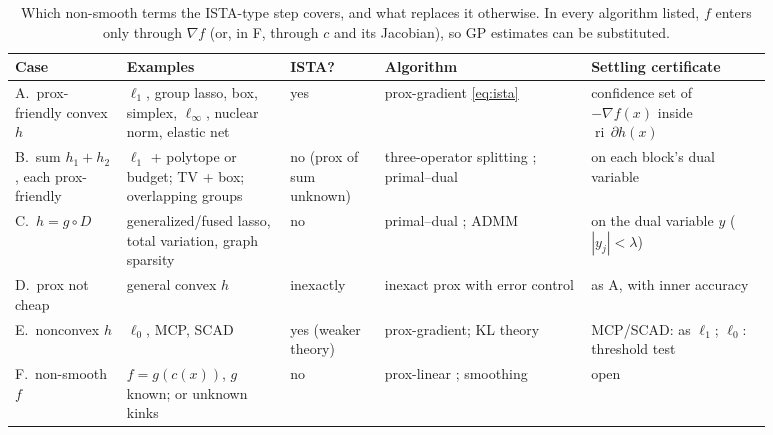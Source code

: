 \documentclass[10pt]{article}
\newcommand{\ri}{\operatorname{ri}}
\theoremstyle{remark}
\begin{document}
\begin{table}[t]
\centering\small
\begin{tabular}{@{}L{0.13\linewidth}L{0.19\linewidth}L{0.11\linewidth}L{0.24\linewidth}L{0.21\linewidth}@{}}
\toprule
Case & Examples & ISTA? & Algorithm & Settling certificate\\\midrule
A.\ prox-friendly convex $h$ & $\ell_1$, group lasso, box, simplex, $\ell_\infty$, nuclear norm, elastic net & yes & prox-gradient \eqref{eq:ista} &
confidence set of $-\nabla f(x)$ inside $\ri\,\partial h(x)$\\[2pt]
B.\ sum $h_1+h_2$, each prox-friendly & $\ell_1$ + polytope or budget; TV + box; overlapping groups & no (prox of sum unknown) &
three-operator splitting \citep{davis2017three}; primal--dual \citep{condat2013pd,vu2013pd} & on each block's dual variable\\[2pt]
C.\ $h=g\circ D$ & generalized/fused lasso, total variation, graph sparsity & no & primal--dual \citep{condat2013pd,vu2013pd,chambolle2011pd}; ADMM \citep{boyd2011admm} & on the dual variable $y$ ($|y_j|<\lambda$)\\[2pt]
D.\ prox not cheap & general convex $h$ & inexactly & inexact prox with error control \citep{schmidt2011inexact} & as A, with inner accuracy\\[2pt]
E.\ nonconvex $h$ & $\ell_0$, MCP, SCAD & yes (weaker theory) & prox-gradient; KL theory \citep{attouch2013kl,bolte2014palm} & MCP/SCAD: as $\ell_1$; $\ell_0$: threshold test\\[2pt]
F.\ non-smooth $f$ & $f=g(c(x))$, $g$ known; or unknown kinks & no & prox-linear \citep{lewis2016proxlinear,drusvyatskiy2019composite}; smoothing \citep{nesterov2005smooth,beck2012smoothing} & open\\
\bottomrule
\end{tabular}
\caption{Which non-smooth terms the ISTA-type step covers, and what replaces it otherwise. In every algorithm listed, $f$ enters only
through $\nabla f$ (or, in F, through $c$ and its Jacobian), so GP estimates can be substituted.}\label{tab:ext}
\end{table}
\end{document}
